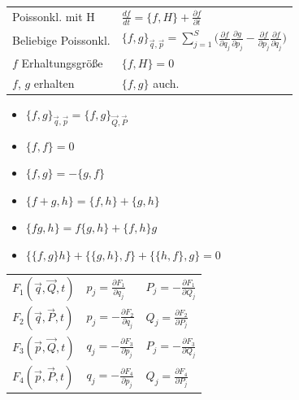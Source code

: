 \documentclass[12pt,a4paper]{article}
\renewcommand{\d}[2]{\frac{d #1}{d #2}}
\newcommand{\pd}[2]{\frac{\partial #1}{\partial #2}}
\renewcommand{\=}[1]{\stackrel{#1}{=}}
\theoremstyle{definition}
\theoremstyle{remark}
\begin{document}
\begin{minipage}[t]{.6\linewidth}
\vspace{0pt}

\begin{tabular}{ll}
Poissonkl. mit H & $\d{f}{t} = \{f, H\} + \pd{f}{t}$\\
Beliebige Poissonkl. & $\{f, g\}_{\vec{q}, \vec{p}} = \sum_{j=1}^S \Big( \pd{f}{q_j} \pd{g}{p_j} - \pd{f}{p_j} \pd{f}{q_j}\Big)$\\
$f$ Erhaltungsgröße & $\{f, H\} = 0$\\
$f$, $g$ erhalten & $\{f, g\}$ auch.\\
\end{tabular}

\begin{itemize}
\itemsep-0.5em
\item $\{f,g\}_{\vec{q}, \vec{p}} = \{f,g\}_{\vec{Q}, \vec{P}}$
\item $\{f, f\} = 0$
\item $\{f,g\} = -\{g, f\}$
\item $\{f+g, h\} = \{f,h\} + \{g, h\}$
\item $\{fg, h\} = f\{g,h\} + \{f,h\}g$
\item $\{\{f,g\}h\} + \{\{g,h\}, f\} + \{\{h,f\}, g\} = 0$
\end{itemize}

\begin{tabular}{l|l|l}
$F_1(\vec{q}, \vec{Q}, t)$ & $p_j = \pd{F_1}{q_j}$ & $P_j = - \pd{F_1}{Q_j}$\\
$F_2(\vec{q}, \vec{P}, t)$ & $p_j = -\pd{F_2}{q_j}$ & $Q_j = \pd{F_2}{P_j}$\\
$F_3(\vec{p}, \vec{Q}, t)$ & $q_j = -\pd{F_3}{p_j}$ & $P_j = - \pd{F_3}{Q_j}$\\
$F_4(\vec{p}, \vec{P}, t)$ & $q_j = -\pd{F_4}{p_j}$ & $Q_j = \pd{F_4}{P_j}$\\
\end{tabular}

\end{minipage}%
\end{document}
